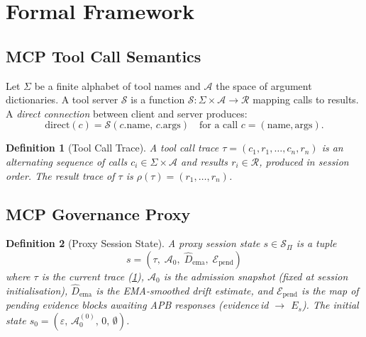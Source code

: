 \documentclass[11pt]{article}
\newtheorem{definition}{Definition}[section]
\newcommand{\Azero}{\mathcal{A}_0}
\newcommand{\Dhat}{\widehat{D}}
\newcommand{\Es}{E_s}
\newcommand{\Proxy}{\Pi}
\newcommand{\ProxyState}{\mathcal{S}_\Proxy}
\begin{document}
\section{Formal Framework}
\label{sec:framework}

\subsection{MCP Tool Call Semantics}
\label{sec:mcp-semantics}

Let $\Sigma$ be a finite alphabet of tool names and $\mathcal{A}$
the space of argument dictionaries. A tool server $\mathcal{S}$ is
a function $\mathcal{S}: \Sigma \times \mathcal{A} \to \mathcal{R}$
mapping calls to results. A \emph{direct connection} between client
and server produces:
\[
  \mathrm{direct}(c) = \mathcal{S}(c.\text{name},\,c.\text{args})
  \quad\text{for a call } c = (\text{name}, \text{args}).
\]

\begin{definition}[Tool Call Trace]
\label{def:trace}
A \emph{tool call trace} $\tau = (c_1, r_1, \ldots, c_n, r_n)$ is
an alternating sequence of calls $c_i \in \Sigma \times \mathcal{A}$
and results $r_i \in \mathcal{R}$, produced in session order.
The \emph{result trace} of $\tau$ is $\rho(\tau) = (r_1, \ldots, r_n)$.
\end{definition}

\subsection{MCP Governance Proxy}
\label{sec:proxy}

\begin{definition}[Proxy Session State]
\label{def:proxy-state}
A \emph{proxy session state} $s \in \ProxyState$ is a tuple
\[
  s = (\tau,\; \Azero,\; \Dhat_\text{ema},\; \mathcal{E}_\text{pend})
\]
where $\tau$ is the current trace (\ref{def:trace}), $\Azero$ is the
admission snapshot (fixed at session initialisation), $\Dhat_\text{ema}$
is the EMA-smoothed drift estimate, and $\mathcal{E}_\text{pend}$ is
the map of pending evidence blocks awaiting APB responses (evidence\,id
$\to$ $\Es$). The initial state $s_0 = (\varepsilon,\,\Azero^{(0)},\,
0,\,\emptyset)$.
\end{definition}
\end{document}
